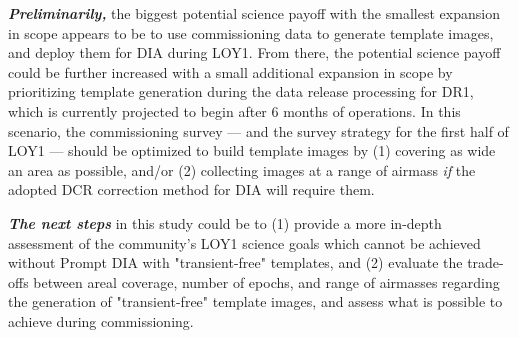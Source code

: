 \documentclass[DM,lsstdraft,toc]{lsstdoc}
\begin{document}
{\bf {\em Preliminarily,}} the biggest potential science payoff with the smallest expansion in scope appears to be to use commissioning data to generate template images, and deploy them for DIA during LOY1. From there, the potential science payoff could be further increased with a small additional expansion in scope by prioritizing template generation during the data release processing for DR1, which is currently projected to begin after 6 months of operations. In this scenario, the commissioning survey --- and the survey strategy for the first half of LOY1 --- should be optimized to build template images by (1) covering as wide an area as possible, and/or (2) collecting images at a range of airmass {\em if} the adopted DCR correction method for DIA will require them.

{\bf {\em The next steps}} in this study could be to (1) provide a more in-depth assessment of the community's LOY1 science goals which cannot be achieved without Prompt DIA with "transient-free" templates, and (2) evaluate the trade-offs between areal coverage, number of epochs, and range of airmasses regarding the generation of "transient-free" template images, and assess what is possible to achieve during commissioning.







\end{document}
